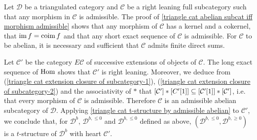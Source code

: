 \begin{remark}
Let $\mathcal{D}$ be a triangulated category and $\mathcal{C}$ be a right leaning full subcategory such that any morphism in $\mathcal{C}$ is admissible. The proof of \cref{triangle cat abelian subcat iff morphism admissible} shows that any morphism of $\mathcal{C}$ has a kernel and a cokernel, that $\operatorname{im} f=\operatorname{coim} f$ and that any short exact sequence of $\mathcal{C}$ is admissible. For $\mathcal{C}$ to be abelian, it is necessary and sufficient that $\mathcal{C}$ admits finite direct sums.\par
Let $\mathcal{C}'$ be the category $E\mathcal{C}$ of successive extensions of objects of $\mathcal{C}$. The long exact sequence of $\mathrm{Hom}$ shows that $\mathcal{C}'$ is right leaning. Moreover, we deduce from (\ref{triangle cat extension closure of subcategory-1}), (\ref{triangle cat extension closure of subcategory-2}) and the associativity of $\ast$ that $[\mathcal{C}']\ast[C'[1]]\subseteq[\mathcal{C}'[1]]\ast[\mathcal{C}']$, i.e. that every morphism of $\mathcal{C}$ is admissible. Therefore $\mathcal{C}$ is an admissible abelian subcategory of $\mathcal{D}$. Applying \cref{triangle cat t-structure by admissible abelian} to $\mathcal{C}'$, we conclude that, for $\mathcal{D}^b$, $\mathcal{D}^{b,\leq 0}$ and $\mathcal{D}^{b,\leq 0}$ defined as above, $(\mathcal{D}^{b,\leq 0},\mathcal{D}^{b,\geq 0})$ is a $t$-structure of $\mathcal{D}^b$ with heart $\mathcal{C}'$.
\end{remark}

